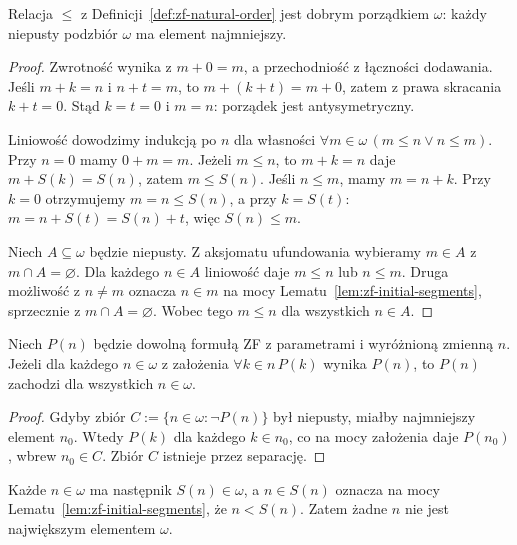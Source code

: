 \begin{twierdzenie}
\label{thm:zf-wellordered-omega}
Relacja $\le$ z Definicji~\ref{def:zf-natural-order}
jest dobrym porządkiem $\omega$:
każdy niepusty podzbiór $\omega$
ma element najmniejszy.
\end{twierdzenie}
\begin{proof}
Zwrotność wynika z $m+0=m$,
a przechodniość z łączności dodawania.
Jeśli $m+k=n$ i $n+t=m$,
to $m+(k+t)=m+0$, zatem
z prawa skracania $k+t=0$.
Stąd $k=t=0$ i $m=n$:
porządek jest antysymetryczny.

Liniowość dowodzimy indukcją po $n$
dla własności $\forall m\in\omega\,
(m\le n\lor n\le m)$.
Przy $n=0$ mamy $0+m=m$.
Jeżeli $m\le n$, to
$m+k=n$ daje $m+S(k)=S(n)$,
zatem $m\le S(n)$. Jeśli $n\le m$,
mamy $m=n+k$. Przy $k=0$
otrzymujemy $m=n\le S(n)$,
a przy $k=S(t)$:
$m=n+S(t)=S(n)+t$, więc $S(n)\le m$.

Niech $A\subseteq\omega$ będzie niepusty.
Z aksjomatu ufundowania wybieramy $m\in A$
z $m\cap A=\varnothing$. Dla każdego $n\in A$
liniowość daje $m\le n$ lub $n\le m$.
Druga możliwość z $n\ne m$
oznacza $n\in m$ na mocy
Lematu~\ref{lem:zf-initial-segments},
sprzecznie z $m\cap A=\varnothing$.
Wobec tego $m\le n$ dla wszystkich $n\in A$.
\end{proof}

\begin{wniosek}\label{cor:zf-strong-induction}
Niech $P(n)$ będzie dowolną formułą ZF
z parametrami i wyróżnioną zmienną $n$.
Jeżeli dla każdego $n\in\omega$
z założenia $\forall k\in n\,P(k)$
wynika $P(n)$, to $P(n)$ zachodzi
dla wszystkich $n\in\omega$.
\end{wniosek}
\begin{proof}
Gdyby zbiór $C:=\{n\in\omega:\neg P(n)\}$
był niepusty, miałby najmniejszy element $n_0$.
Wtedy $P(k)$ dla każdego $k\in n_0$,
co na mocy założenia daje $P(n_0)$,
wbrew $n_0\in C$.
Zbiór $C$ istnieje przez separację.
\end{proof}

\begin{przyklad}
\label{ex:zf-no-largest}
Każde $n\in\omega$ ma następnik
$S(n)\in\omega$, a
$n\in S(n)$ oznacza na mocy
Lematu~\ref{lem:zf-initial-segments},
że $n<S(n)$. Zatem żadne $n$
nie jest największym elementem $\omega$.
\end{przyklad}

